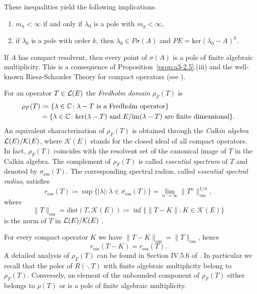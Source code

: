 \begin{example}
These inequalities yield the following implications.
\begin{enumerate}[\upshape (i)]
\item
$m_{a} < \infty$ if and only if $\lambda_{0}$ is a pole with $m_{g} < \infty$,
\item
if $\lambda_{0}$ is a pole with order $k$, then $\lambda_{0} \in P\sigma(A)$ and $PE = \text{ker}(\lambda_{0} - A)^{k}$.
\end{enumerate}
If $A$ has compact resolvent, then every point of $\sigma(A)$ is a pole of finite algebraic multiplicity.
This is a consequence of Proposition~\ref{prop:a3-2.5}.(iii) and the well-known Riesz-Schauder Theory for compact operators (see \citet[VII.4.5]{dunfordschwartz:1958}).
\end{example}
\begin{example}\label{subsec:a3-3.7}	%
For an operator $T \in \mathcal{L}(E)$ the \emph{Fredholm domain} $\rho_{F}(T)$ is
\begin{equation}\label{eq:a3-3.5} 
\begin{aligned}
	\rho_{F}(T) & \coloneqq  \{\lambda \in \mathbb{C} \colon \lambda - T \text{ is a Fredholm operator}\}\\
	& =  \{\lambda \in \mathbb{C} \colon \text{ker}(\lambda - T) \text{ and }  E / \mathrm{im}(\lambda - T) \text{ are finite dimensional}\}.
\end{aligned}
\end{equation}
An equivalent characterization of $\rho_{F}(T)$ is obtained through the \emph{Calkin algebra} $\mathcal{L}(E)/\mathcal{K}(E)$, where $\mathcal{K}(E)$ stands for the closed ideal of all compact operators.
In fact, $\rho_{F}(T)$ coincides with the resolvent set of the canonical image of $T$ in the Calkin algebra.
The complement of $\rho_{F}(T)$ is called \emph{essential spectrum} of $T$ and denoted by $\sigma_{\text{ess}}(T)$.
The corresponding spectral radius, called \emph{essential spectral radius}, satisfies
\begin{equation}\label{eq:a3-3.6}
r_{\text{ess}}(T) \coloneqq \sup \{|\lambda| \colon \lambda \in \sigma_{\text{ess}}(T)\} = \lim_{n \to \infty} \|T^{n}\|_{\text{ess}}^{1/n} ,
\end{equation}
where 
%
\[
	\|T\|_{\text{ess}} = \text{dist}(T,\mathcal{K}(E)) \coloneqq \inf \{\|T - K\| \colon K \in \mathcal{K}(E)\}
\]
%
is the norm of $T$ in $\mathcal{L}(E)/\mathcal{K}(E)$ .

For every compact operator $K$ we have $\|T - K\|_{\text{ess}} = \|T\|_{\text{ess}}$, hence
\begin{equation}\label{eq:a3-3.7}
r_{\text{ess}}(T - K) = r_{\text{ess}}(T) .
\end{equation}
A detailed analysis of $\rho_{F}(T)$ can be found in Section IV.5.6 of \citet{kato:1966}.
In particular we recall that the poles of $R(\cdot,T)$ with finite algebraic multiplicity belong to $\rho_{F}(T)$.
Conversely, an element of the unbounded component of $\rho_{F}(T)$ either belongs to $\rho(T)$ or is a pole of finite algebraic multiplicity.


\end{example}
